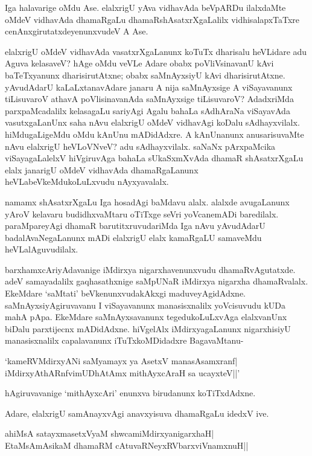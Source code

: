 Iga halavarige oMdu Ase. elalxrigU yAva vidhavAda beVpARDu ilalxdaMte oMdeV vidhavAda dhamaRgaLu dhamaRshAsatxrXgaLalilx vidhisalapxTaTxre cenAnxgirutatxdeyenunxvudeV A Ase.

elalxrigU oMdeV vidhavAda vasatxrXgaLanunx koTuTx dharisalu heVLidare adu Aguva kelasaveV? hAge oMdu veVLe Adare obabx poVliVsinavanU kAvi baTeTxyanunx dharisirutAtxne; obabx saMnAyxsiyU kAvi dharisirutAtxne. yAvudAdarU kaLaLxtanavAdare janaru A nija saMnAyxsige A viSayavanunx tiLisuvaroV athavA poVlisinavanAda saMnAyxsige tiLisuvaroV? AdadxriMda parxpaMcadalilx kelasagaLu sariyAgi Agalu bahaLa sAdhAraNa viSayavAda vasutxgaLanUnx saha nAvu elalxrigU oMdeV vidhavAgi koDalu sAdhayxvilalx. hiMdugaLigeMdu oMdu kAnUnu mADidAdxre. A kAnUnanunx anusarisuvaMte nAvu elalxrigU heVLoVNveV? adu sAdhayxvilalx. saNaNx pArxpaMcika viSayagaLalelxV hiVgiruvAga bahaLa sUkaSxmXvAda dhamaR shAsatxrXgaLu elalx janarigU oMdeV vidhavAda dhamaRgaLanunx heVLabeVkeMdukoLuLxvudu nAyxyavalalx.

namamx shAsatxrXgaLu Iga hosadAgi baMdavu alalx. alalxde avugaLanunx yAroV kelavaru budidhxvaMtaru oTiTxge seVri yoVcanemADi baredilalx. paraMpareyAgi dhamaR barutitxruvudariMda Iga nAvu yAvudAdarU badalAvaNegaLanunx mADi elalxrigU elalx kamaRgaLU samaveMdu heVLalAguvudilalx.

barxhamxcAriyAdavanige iMdirxya nigarxhavenunxvudu dhamaRvAgutatxde. adeV samayadalilx gaqhasathxnige saMpUNaR iMdirxya nigarxha dhamaRvalalx. EkeMdare `saMtati' beVkenunxvudakAkxgi maduveyAgidAdxne. saMnAyxsiyAgiruvavanu I viSayavanunx manasisxnalilx yoVcisuvudu kUDa mahA pApa. EkeMdare saMnAyxsavanunx tegedukoLuLxvAga elalxvanUnx biDalu parxtijecnx mADidAdxne. hiVgelAlx iMdirxyagaLanunx nigarxhisiyU manasisxnalilx capalavanunx iTuTxkoMDidadxre BagavaMtanu-

\begin{shloka}
`kameRVMdirxyANi saMyamayx ya AsetxV manasAsamxranf|\\
iMdirxyAthARnfvimUDhAtAmx mithAyxcAraH sa ucayxteV||'
\end{shloka}

hAgiruvavanige `mithAyxcAri' enunxva birudanunx koTiTxdAdxne.

Adare, elalxrigU samAnayxvAgi anavxyisuva dhamaRgaLu idedxV ive.

\begin{shloka}
ahiMsA satayxmasetxVyaM shwcamiMdirxyanigarxhaH|\\
EtaMsAmAsikaM dhamaRM cAtuvaRNeyxRV\s barxviVnamxnuH||
\end{shloka}


